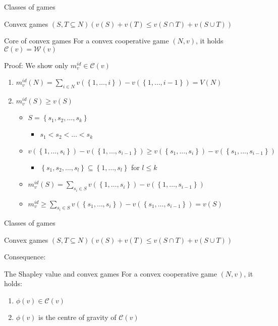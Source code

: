 \documentclass{beamer}
\begin{document}
\begin{frame}{Classes of games}
    \begin{block}{Convex games}
		$\left(S,T \subseteq N\right)\left(v(S)+v(T) \leq v\left(S \cap T\right)+v\left(S \cup T\right)\right)$
	\end{block}
	\begin{block}{Core of convex games}
		For a convex cooperative game $(N,v)$, it holds $\mathcal{C}(v)=\mathcal{W}(v)$
	\end{block}
	Proof: We show only $m^{id}_v \in \mathcal{C}(v)$
	\begin{enumerate}
		\item $m^{id}_v(N)=\sum_{i \in N} v \left(\left\{1,\dots,i\right\}\right)-v \left(\left\{1,\dots,i-1\right\}\right)=V(N)$
		\item $m^{id}_v(S) \geq v(S)$
		\begin{itemize}
			\item $S=\left\{s_1,s_2,\dots,s_k\right\}$
			\begin{itemize}
				\item $s_1<s_2<\dots<s_k$
			\end{itemize}
			\item $v (\left\{1,...,s_i\right\})-v (\left\{1,...,s_{i-1}\right\}) \geq v (\left\{s_1,...,s_i\right\})-v (\left\{s_1,...,s_{i-1}\right\})$
			\begin{itemize}
				\item $\left\{s_1,s_2,\dots,s_l\right\} \subseteq \left\{1,\dots,s_l\right\}$ for $l \leq k$
			\end{itemize}
			\item $m^{id}_v(S)=\sum_{s_i \in S} v \left(\left\{1,\dots,s_i\right\}\right) - v \left(\left\{1,\dots,s_{i-1}\right\}\right)$
			\item $m^{id}_v \geq \sum_{s_i \in S} v \left(\left\{s_1,\dots,s_i\right\}\right)-v \left(\left\{s_1,\dots,s_{i-1}\right\}\right)=v(S)$
		\end{itemize}
	\end{enumerate}
\end{frame}



\begin{frame}{Classes of games}
    \begin{block}{Convex games}
		$\left(S,T \subseteq N\right)\left(v(S)+v(T) \leq v\left(S \cap T\right)+v\left(S \cup T\right)\right)$
	\end{block}
	Consequence:
	\begin{block}{The Shapley value and  convex games}
		For a convex cooperative game $(N,v)$, it holds:
		\begin{enumerate}
			\item $\phi(v) \in \mathcal{C}(v)$
			\item $\phi(v)$ is the centre of gravity of $\mathcal{C}(v)$
		\end{enumerate}
	\end{block}
\end{frame}
\end{document}
